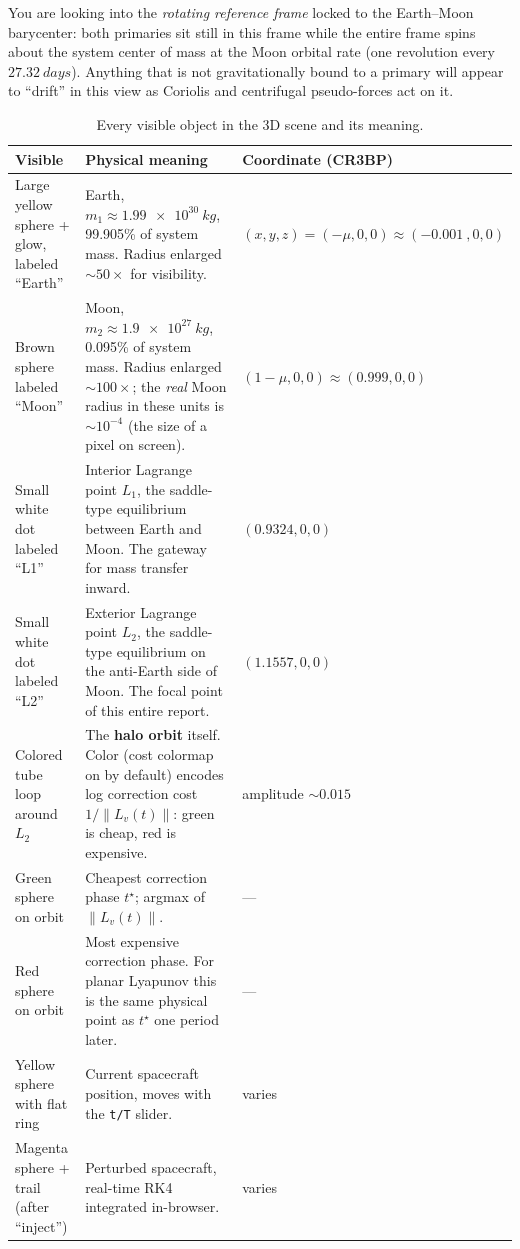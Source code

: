 \documentclass[11pt,a4paper]{article}
\begin{document}
You are looking into the \emph{rotating reference frame} locked to the Earth--Moon barycenter: both primaries sit still in this frame while the entire frame spins about the system center of mass at the Moon orbital rate (one revolution every $\SI{27.32}{days}$). Anything that is not gravitationally bound to a primary will appear to ``drift'' in this view as Coriolis and centrifugal pseudo-forces act on it.

\begin{table}[H]
\centering
\small
\caption{Every visible object in the 3D scene and its meaning.}
\begin{tabularx}{\textwidth}{@{}l X l@{}}
\toprule
\textbf{Visible} & \textbf{Physical meaning} & \textbf{Coordinate (CR3BP)} \\
\midrule
Large yellow sphere + glow, labeled ``Earth'' & Earth, $m_1 \approx \SI{1.99e30}{kg}$, 99.905\% of system mass. Radius enlarged $\sim 50\times$ for visibility. & $(x,y,z) = (-\mu, 0, 0) \approx (-\SI{0.001}{}, 0, 0)$ \\
Brown sphere labeled ``Moon'' & Moon, $m_2 \approx \SI{1.9e27}{kg}$, 0.095\% of system mass. Radius enlarged $\sim 100\times$; the \emph{real} Moon radius in these units is $\sim 10^{-4}$ (the size of a pixel on screen). & $(1-\mu, 0, 0) \approx (0.999, 0, 0)$ \\
Small white dot labeled ``L1'' & Interior Lagrange point $L_1$, the saddle-type equilibrium between Earth and Moon. The gateway for mass transfer inward. & $(0.9324, 0, 0)$ \\
Small white dot labeled ``L2'' & Exterior Lagrange point $L_2$, the saddle-type equilibrium on the anti-Earth side of Moon. The focal point of this entire report. & $(1.1557, 0, 0)$ \\
Colored tube loop around $L_2$ & The \textbf{halo orbit} itself. Color (cost colormap on by default) encodes log correction cost $1/\|L_v(t)\|$: green is cheap, red is expensive. & amplitude $\sim 0.015$ \\
Green sphere on orbit & Cheapest correction phase $t^\star$; argmax of $\|L_v(t)\|$. & --- \\
Red sphere on orbit & Most expensive correction phase. For planar Lyapunov this is the same physical point as $t^\star$ one period later. & --- \\
Yellow sphere with flat ring & Current spacecraft position, moves with the \texttt{t/T} slider. & varies \\
Magenta sphere + trail (after ``inject'') & Perturbed spacecraft, real-time RK4 integrated in-browser. & varies \\

\end{tabularx}
\end{table}
\end{document}
